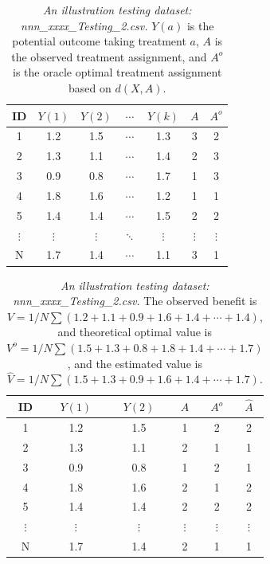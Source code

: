 \documentclass[12pt]{article}
\def\hat{\widehat}
\begin{document}
\begin{table}[htbp]
  \centering
  \caption{\emph{An illustration testing dataset: nnn\_xxxx\_Testing\_2.csv.} $Y(a)$ is the potential outcome taking treatment $a$, $A$ is the observed treatment assignment, and $A^o$ is the oracle optimal treatment assignment based on $d(X,A)$.}
    \begin{tabular}{c|cccc|cc}
    \hline
    \hline
    ID &  $Y(1)$    & $Y(2)$    & $\cdots$  & $Y(k)$ & $A$ & $A^o$   \\
    \hline
    1& 1.2    & 1.5    &  $\cdots$  & 1.3 & 3 & 2 \\
    2& 1.3    & 1.1    &  $\cdots$  & 1.4 & 2 & 3 \\
    3& 0.9    & 0.8    &  $\cdots$  & 1.7 & 1 & 3 \\
    4& 1.8    & 1.6    &  $\cdots$  & 1.2 & 1 & 1 \\
    5& 1.4    & 1.4    &  $\cdots$  & 1.5 & 2 & 2 \\
    $\vdots$ &  $\vdots$   & $\vdots$     & $\ddots$     & $\vdots$ &  $\vdots$   & $\vdots$ \\
    N & 1.7    & 1.4    &  $\cdots$  & 1.1 & 3 & 1 \\
    \hline
    \hline
    \end{tabular}%
  \label{tab:TestingDataExample2}%
\end{table}

\begin{table}[htbp]
	\centering
	\caption{\emph{An illustration testing dataset: nnn\_xxxx\_Testing\_2.csv.} The observed benefit is $V=1/N \sum (1.2+1.1+0.9+1.6+1.4+\cdots+1.4)$, and theoretical optimal value is $V^o=1/N \sum (1.5+1.3+0.8+1.8+1.4+\cdots+1.7)$, and the estimated value is $\hat{V}=1/N \sum (1.5+1.3+0.9+1.6+1.4+\cdots+1.7)$.}
	\begin{tabular}{c|cc|ccc}
		\hline
		ID &  $Y(1)$    & $Y(2)$    & $A$ & $A^o$ & $\hat{A} $  \\
		\hline
		1& 1.2    & 1.5    &   1& 2 &2 \\
		2& 1.3    & 1.1    &  2 & 1 &1\\
		3& 0.9    & 0.8    &    1 & 2 &1 \\
		4& 1.8    & 1.6    &   2 & 1 &2 \\
		5& 1.4    & 1.4    &  2 & 2 &2 \\
		$\vdots$ &  $\vdots$   & $\vdots$     & $\vdots$     & $\vdots$ &  $\vdots$    \\
		N & 1.7    & 1.4    &   2 & 1 &1\\
		\hline
		\hline
	\end{tabular}%
	\label{tab:TestingDataExample3}%
\end{table}
\end{document}
